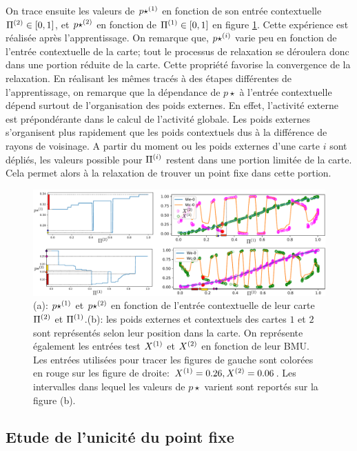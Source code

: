 On trace ensuite les valeurs de $p\star^{({1})}$ en fonction de son entrée contextuelle $\Pi^{({2})} \in [0,1]$, et $p\star^{({2})}$ en fonction de $\Pi^{({1})} \in [0,1]$ en figure \ref{fig:w006}.
Cette expérience est réalisée après l'apprentissage. On remarque que, $p\star^{({i})}$ varie peu en fonction de l'entrée contextuelle de la carte; tout le processus de relaxation se déroulera donc dans une portion réduite de la carte. Cette propriété favorise la convergence de la relaxation.
En réalisant les mêmes tracés à des étapes différentes de l'apprentissage, on remarque que la dépendance de $p\star$ à l'entrée contextuelle dépend surtout de l'organisation des poids externes. En effet, l'activité externe est prépondérante dans le calcul de l'activité globale. Les poids externes s'organisent plus rapidement que les poids contextuels dus à la différence de rayons de voisinage. A partir du moment ou les poids externes d'une carte $i$ sont dépliés, les valeurs possible pour $\Pi^{({i})}$ restent dans une portion limitée de la carte. Cela permet alors à la relaxation de trouver un point fixe dans cette portion.

\begin{figure}
\includegraphics[width=\textwidth]{am_w_006}
\caption{(a): $p\star^{({1})}$ et $p\star^{({2})}$ en fonction de l'entrée contextuelle de leur carte $\Pi^{({2})}$ et $\Pi^{({1})}$.(b): les poids externes et contextuels des cartes $1$ et $2$ sont représentés selon leur position dans la carte. On représente également les entrées test $X^{({1})}$ et $X^{({2})}$ en fonction de leur BMU. Les entrées utilisées pour tracer les figures de gauche sont colorées en rouge sur les figure de droite: $X^{({1})}=0.26,X^{({2})}=0.06$. Les intervalles dans lequel les valeurs de $p\star$ varient sont reportés sur la figure (b).}
\label{fig:w006}
\end{figure}



\subsection{Etude de l'unicité du point fixe}\label{sec:pf}

